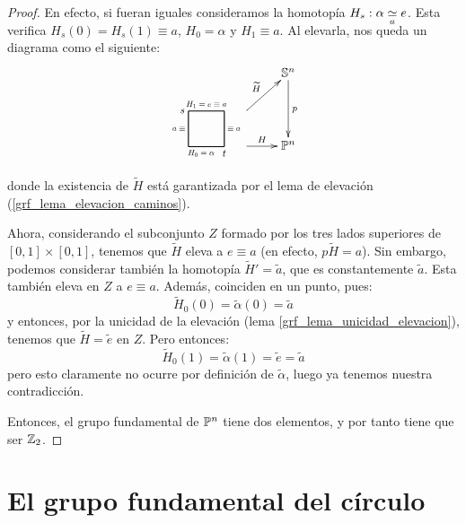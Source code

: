 \begin{theo}
\begin{proof}
		En efecto, si fueran iguales consideramos la homotopía $H_s:\alpha\homot[a] e$. Esta verifica $H_s(0)=H_s(1)\equiv a$, $H_0=\alpha$ y $H_1\equiv a$. Al elevarla, nos queda un diagrama como el siguiente:
		\[\xymatrix{
			& \Sfe^n \ar[d]^p \\
			\begin{tikzpicture}[baseline=-0.5ex,
			scale=0.5,
			vdot/.style={rectangle, fill, inner sep=0pt, outer sep=0pt, minimum width=0.5pt, minimum height=6pt},
			dot/.style={draw,fill,circle,inner sep=1.5pt,minimum width=0pt, scale=0.45}
			]
			\draw[thick]
			(0,0) coordinate (a1) -- node[left,scale=0.65]{$a\equiv$} (0,2) coordinate (d1)
			(2,0) coordinate (b1) -- node[right,scale=0.65](q1){$\equiv a$} (2,2) coordinate (c1);
			\draw[thick] (d1) -- node[above,scale=0.65] {$H_1=e\equiv a$} (2,2) coordinate (c1);
			\draw[thick] (a1) -- node[below,scale=0.65] {$H_0=\alpha\quad\;$} (b1);
			\node[below,scale=0.8] at (b1) {$t$};
			\node[left,scale=0.8] at (d1) {$s$};
			\end{tikzpicture} \ar[r]^-H \ar[ru]^-{\widetilde{H}} & \proy^n
		}\]
		
		donde la existencia de $\widetilde{H}$ está garantizada por el lema de elevación (\ref{grf_lema_elevacion_caminos}). 
		
		Ahora, considerando el subconjunto $Z$ formado por los tres lados superiores de $[0,1]\times [0,1]$, tenemos que $\widetilde{H}$ eleva a $e\equiv a$ (en efecto, $p\widetilde{H}=a$). Sin embargo, podemos considerar también la homotopía $\widetilde{H}'=\widetilde{a}$, que es constantemente $\widetilde{a}$. Esta también eleva en $Z$ a $e\equiv a$. Además, coinciden en un punto, pues:
		\[\widetilde{H}_0(0)=\widetilde{\alpha}(0)=\widetilde{a}\]
		y entonces, por la unicidad de la elevación (lema \ref{grf_lema_unicidad_elevacion}), tenemos que $\widetilde{H}=\widetilde{e}$ en $Z$. Pero entonces:
		\[\widetilde{H}_0(1) = \widetilde{\alpha}(1) = \widetilde{e} = \widetilde{a}\]
		pero esto claramente no ocurre por definición de $\widetilde{\alpha}$, luego ya tenemos nuestra contradicción.
		
		Entonces, el grupo fundamental de $\proy^n$ tiene dos elementos, y por tanto tiene que ser $\Z_2$.
	\end{proof}
\end{theo}

\section{El grupo fundamental del círculo}

